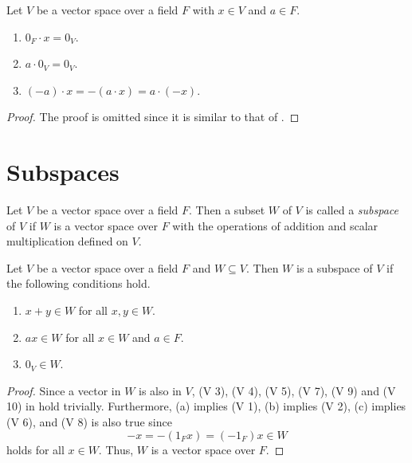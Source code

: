 \begin{proposition}\label{prop:vector-space-operation}
  Let $V$ be a vector space over a field $F$ with $x \in V$ and $a \in F$.
  \begin{enumerate}
    \item $0_F \cdot x = 0_V$.
    \item $a \cdot 0_V = 0_V$.
    \item $(-a) \cdot x = -(a \cdot x) = a \cdot (-x)$.
  \end{enumerate}
\end{proposition}
\begin{proof}
  The proof is omitted since it is similar to that of
  .
\end{proof}

\section{Subspaces}
\begin{definition}\label{def:subspace}
  Let $V$ be a vector space over a field $F$.
  Then a subset $W$ of $V$ is called a \emph{subspace} of $V$ if $W$ is a
  vector space over $F$ with the operations of addition and scalar
  multiplication defined on $V$.
\end{definition}

\begin{theorem}\label{thm:subspace}
  Let $V$ be a vector space over a field $F$ and $W \subseteq V$.
  Then $W$ is a subspace of $V$ if the following conditions hold.
  \begin{enumerate}
    \item $x + y \in W$ for all $x, y \in W$.
    \item $ax \in W$ for all $x \in W$ and $a \in F$.
    \item $0_V \in W$.
  \end{enumerate}
\end{theorem}
\begin{proof}
  Since a vector in $W$ is also in $V$, (V 3), (V 4), (V 5), (V 7), (V 9) and
  (V 10) in  hold trivially.
  Furthermore, (a) implies (V 1), (b) implies (V 2), (c) implies (V 6), and
  (V 8) is also true since
  \begin{equation*}
    -x = -(1_Fx) = (-1_F)x \in W
  \end{equation*}
  holds for all $x \in W$.
  Thus, $W$ is a vector space over $F$.
\end{proof}

